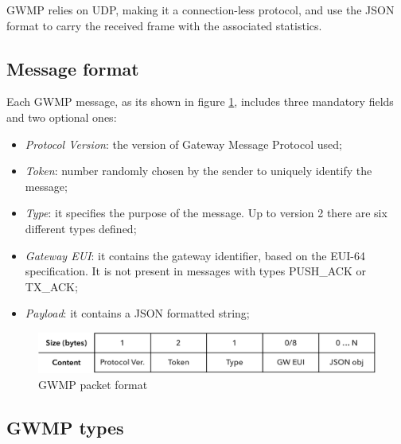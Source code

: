GWMP relies on UDP, making it a connection-less protocol, and use the JSON format to carry the received frame with the associated statistics.

\subsection{Message format} Each GWMP message, as its shown in figure \ref{fig:gwmp}, includes three mandatory fields and two optional ones:
\begin{itemize}
\item \emph{Protocol Version}: the version of Gateway Message Protocol used;
\item \emph{Token}: number randomly chosen by the sender to uniquely identify the message;
\item \emph{Type}: it specifies the purpose of the message. Up to version 2 there are six different types defined;
\item \emph{Gateway EUI}: it contains the gateway identifier, based on the EUI-64 specification. It is not present in messages with types PUSH\_ACK or TX\_ACK;
\item \emph{Payload}: it contains a JSON formatted string;
\end{itemize}

\begin{figure}[]
\centering
\includegraphics[width=\textwidth]{img/msgformat/gwmp}
\caption{GWMP packet format}
\label{fig:gwmp}
\end{figure}

\subsection{GWMP types}


